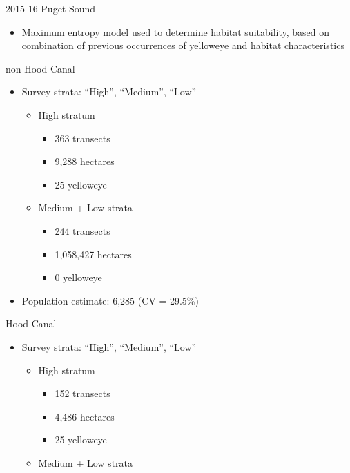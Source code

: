 \documentclass[
  ignorenonframetext,
]{beamer}
\providecommand{\tightlist}{%
  \setlength{\itemsep}{0pt}\setlength{\parskip}{0pt}}
\begin{document}
\begin{frame}{2015-16 Puget Sound}
\protect\hypertarget{puget-sound}{}
\begin{itemize}
\tightlist
\item
  Maximum entropy model used to determine habitat suitability, based on
  combination of previous occurrences of yelloweye and habitat
  characteristics
\end{itemize}

\begin{block}{non-Hood Canal}
\protect\hypertarget{non-hood-canal}{}
\begin{itemize}
\tightlist
\item
  Survey strata: ``High'', ``Medium'', ``Low''

  \begin{itemize}
  \tightlist
  \item
    High stratum

    \begin{itemize}
    \tightlist
    \item
      363 transects
    \item
      9,288 hectares
    \item
      25 yelloweye
    \end{itemize}
  \item
    Medium + Low strata

    \begin{itemize}
    \tightlist
    \item
      244 transects
    \item
      1,058,427 hectares
    \item
      0 yelloweye
    \end{itemize}
  \end{itemize}
\item
  Population estimate: 6,285 (CV = 29.5\%)
\end{itemize}
\end{block}

\begin{block}{Hood Canal}
\protect\hypertarget{hood-canal}{}
\begin{itemize}
\tightlist
\item
  Survey strata: ``High'', ``Medium'', ``Low''

  \begin{itemize}
  \tightlist
  \item
    High stratum

    \begin{itemize}
    \tightlist
    \item
      152 transects
    \item
      4,486 hectares
    \item
      25 yelloweye
    \end{itemize}
  \item
    Medium + Low strata


\end{itemize}
\end{itemize}
\end{block}
\end{frame}
\end{document}
